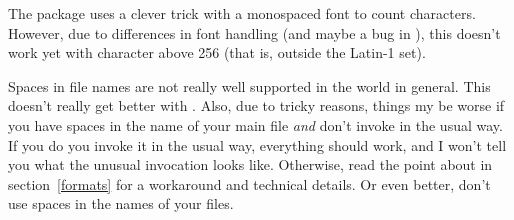 \documentclass{lltxdoc}
\begin{document}
 The  package uses a clever trick with a monospaced font
to count characters. However, due to differences in font handling (and maybe a
bug in \luatex), this doesn't work yet with character above 256 (that is,
outside the Latin-1 set).

 Spaces in file names are not really well supported in the \tex
world in general. This doesn't really get better with \luatex. Also, due to
tricky reasons, things my be worse if you have spaces in the name of your main
\tex file \emph{and} don't invoke \luatex in the usual way. If you do you
invoke it in the usual way, everything should work, and I won't tell you what
the unusual invocation looks like. Otherwise, read the point about
 in section~\ref{formats} for a workaround and technical
details. Or even better, don't use spaces in the names of your \tex files.
\end{document}
